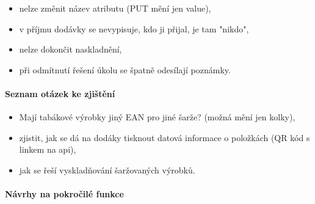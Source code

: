 \begin{itemize}
	\item nelze změnit název atributu (PUT mění jen value),
	\item v příjmu dodávky se nevypisuje, kdo ji přijal, je tam "nikdo",
	\item nelze dokončit naskladnění,
	\item při odmítnutí řešení úkolu se špatně odesílají poznámky.
\end{itemize}

\paragraph{Seznam otázek ke zjištění}

\begin{itemize}
	\item Mají tabákové výrobky jiný EAN pro jiné šarže? (možná mění jen kolky),
	\item zjistit, jak se dá na dodáky tisknout datová informace o položkách (QR kód s linkem na api),
	\item jak se řeší vyskladňování šaržovaných výrobků.
\end{itemize}

\paragraph{Návrhy na pokročilé funkce}

